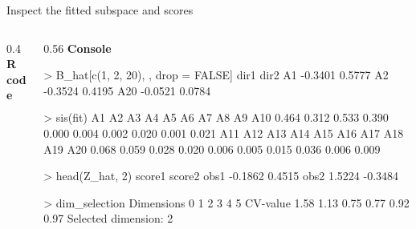 \documentclass[
  ignorenonframetext,
  aspectratio=169,
  11pt]{beamer}
\newenvironment{Shaded}{\begin{snugshade}}{\end{snugshade}}
\newcommand{\ConstantTok}[1]{\textcolor[rgb]{0.56,0.35,0.01}{#1}}
\newcommand{\DecValTok}[1]{\textcolor[rgb]{0.68,0.00,0.00}{#1}}
\newcommand{\FunctionTok}[1]{\textcolor[rgb]{0.28,0.35,0.67}{#1}}
\newcommand{\NormalTok}[1]{\textcolor[rgb]{0.00,0.23,0.31}{#1}}
\newcommand{\OtherTok}[1]{\textcolor[rgb]{0.00,0.23,0.31}{#1}}
\newcommand{\SpecialCharTok}[1]{\textcolor[rgb]{0.37,0.37,0.37}{#1}}
\newcommand{\workflowcodefont}{\fontsize{6.3}{7.1}\selectfont}
\newcommand{\method}[1]{%
  \textcolor{emoryblue}{\textbf{#1}}%
}
\begin{document}
\begin{frame}[fragile,t]{Inspect the fitted subspace and scores}
\protect{}\label{inspect-the-fitted-subspace-and-scores}
\begin{columns}[T]
\begin{column}{0.4\linewidth}
\method{R code}

\workflowcodefont

\begin{Shaded}
\end{Shaded}
\end{column}

\begin{column}{0.56\linewidth}
\method{Console}

\workflowcodefont

\begin{Shaded}
\begin{Highlighting}[]
\NormalTok{\textgreater{} B\_hat[c(1, 2, 20), , drop = FALSE]}
\NormalTok{       dir1    dir2}
\NormalTok{A1 {-}0.3401  0.5777}
\NormalTok{A2 {-}0.3524  0.4195}
\NormalTok{A20 {-}0.0521 0.0784}

\NormalTok{\textgreater{} sis(fit)}
\NormalTok{    A1    A2    A3    A4    A5    A6    A7    A8    A9   A10}
\NormalTok{ 0.464 0.312 0.533 0.390 0.000 0.004 0.002 0.020 0.001 0.021}
\NormalTok{   A11   A12   A13   A14   A15   A16   A17   A18   A19   A20}
\NormalTok{ 0.068 0.059 0.028 0.020 0.006 0.005 0.015 0.036 0.006 0.009}

\NormalTok{\textgreater{} head(Z\_hat, 2)}
\NormalTok{       score1  score2}
\NormalTok{obs1  {-}0.1862  0.4515}
\NormalTok{obs2   1.5224 {-}0.3484}

\NormalTok{\textgreater{} dim\_selection}
\NormalTok{Dimensions      0    1    2    3    4    5}
\NormalTok{CV{-}value     1.58 1.13 0.75 0.77 0.92 0.97}
\NormalTok{Selected dimension: 2}
\end{Highlighting}
\end{Shaded}
\end{column}
\end{columns}
\end{frame}
\end{document}
